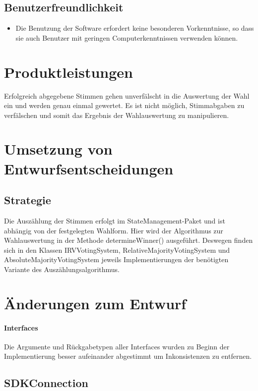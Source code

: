 \documentclass[parskip=full]{scrartcl}
\begin{document}
\subsection{Benutzerfreundlichkeit}
\begin{itemize}
	\item Die Benutzung der Software erfordert keine besonderen Vorkenntnisse, so dass sie auch Benutzer mit geringen Computerkenntnissen verwenden können.
\end{itemize}

\section{Produktleistungen}
Erfolgreich abgegebene Stimmen gehen unverfälscht in die Auswertung der Wahl ein und werden genau einmal gewertet. Es ist nicht möglich, Stimmabgaben zu verfälschen und somit das Ergebnis der Wahlauswertung zu manipulieren.
		
\section{Umsetzung von Entwurfsentscheidungen}
\subsection{Strategie}
Die Auszählung der Stimmen erfolgt im StateManagement-Paket und ist abhängig von der festgelegten Wahlform.
Hier wird der Algorithmus zur Wahlauswertung in der Methode determineWinner() ausgeführt. Deswegen finden sich in den Klassen IRVVotingSystem, RelativeMajorityVotingSystem und AbsoluteMajorityVotingSystem jeweils Implementierungen der benötigten Variante des Auszählungsalgorithmus.


\section{Änderungen zum Entwurf}
\paragraph{Interfaces}
Die Argumente und Rückgabetypen aller Interfaces wurden zu Beginn der Implementierung besser aufeinander abgestimmt um Inkonsistenzen zu entfernen.

\subsection{SDKConnection}
\end{document}
